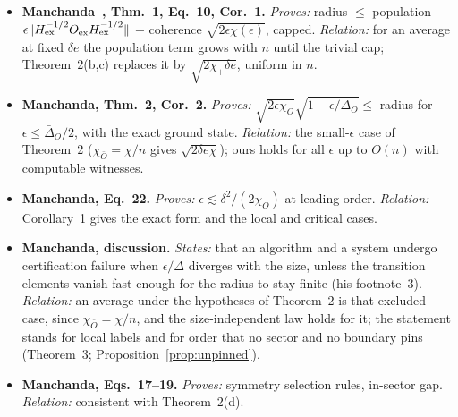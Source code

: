 \documentclass[aps,prx,onecolumn,10pt,nofootinbib,longbibliography,floatfix]{revtex4-2}
\theoremstyle{remark}
\newcommand{\de}{\delta e}
\begin{document}
\begin{itemize}
\item \textbf{Manchanda~\cite{manchanda2026}, Thm.~1, Eq.~10, Cor.~1.} \emph{Proves:} radius $\le$ population $\epsilon\|H_{\rm ex}^{-1/2}O_{\rm ex}H_{\rm ex}^{-1/2}\|$ + coherence $\sqrt{2\epsilon\chi(\epsilon)}$, capped. \emph{Relation:} for an average at fixed $\de$ the population term grows with $n$ until the trivial cap; Theorem~2(b,c) replaces it by $\sqrt{2\chi_+\de}$, uniform in $n$. %
\item \textbf{Manchanda, Thm.~2, Cor.~2.} \emph{Proves:} $\sqrt{2\epsilon\chi_O}\sqrt{1-\epsilon/\bar\Delta_O}\le$ radius for $\epsilon\le\bar\Delta_O/2$, with the exact ground state. \emph{Relation:} the small-$\epsilon$ case of Theorem~2 ($\chi_{\bar O}=\chi/n$ gives $\sqrt{2\de\chi}$); ours holds for all $\epsilon$ up to $O(n)$ with computable witnesses. %
\item \textbf{Manchanda, Eq.~22.} \emph{Proves:} $\epsilon\lesssim\delta^2/(2\chi_O)$ at leading order. \emph{Relation:} Corollary~1 gives the exact form and the local and critical cases. %
\item \textbf{Manchanda, discussion.} \emph{States:} that an algorithm and a system undergo certification failure when $\epsilon/\Delta$ diverges with the size, unless the transition elements vanish fast enough for the radius to stay finite (his footnote~3). \emph{Relation:} an average under the hypotheses of Theorem~2 is that excluded case, since $\chi_{\bar O}=\chi/n$, and the size-independent law holds for it; the statement stands for local labels and for order that no sector and no boundary pins (Theorem~3; Proposition~\ref{prop:unpinned}). %
\item \textbf{Manchanda, Eqs.~17--19.} \emph{Proves:} symmetry selection rules, in-sector gap. \emph{Relation:} consistent with Theorem~2(d). %

\end{itemize}
\end{document}
